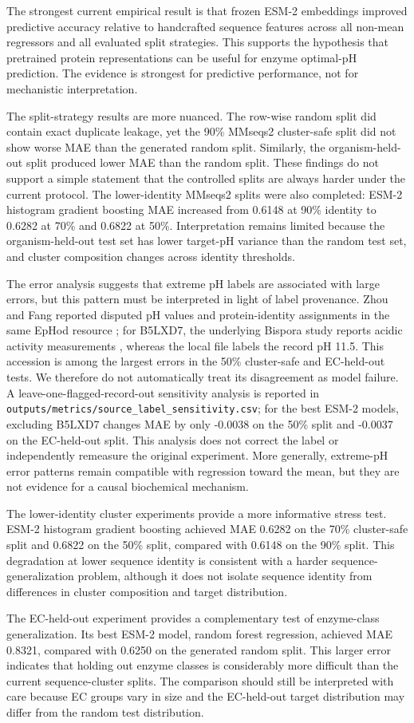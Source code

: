 The strongest current empirical result is that frozen ESM-2 embeddings improved predictive accuracy relative to handcrafted sequence features across all non-mean regressors and all evaluated split strategies. This supports the hypothesis that pretrained protein representations can be useful for enzyme optimal-pH prediction. The evidence is strongest for predictive performance, not for mechanistic interpretation.

The split-strategy results are more nuanced. The row-wise random split did contain exact duplicate leakage, yet the 90\% MMseqs2 cluster-safe split did not show worse MAE than the generated random split. Similarly, the organism-held-out split produced lower MAE than the random split. These findings do not support a simple statement that the controlled splits are always harder under the current protocol. The lower-identity MMseqs2 splits were also completed: ESM-2 histogram gradient boosting MAE increased from 0.6148 at 90\% identity to 0.6282 at 70\% and 0.6822 at 50\%. Interpretation remains limited because the organism-held-out test set has lower target-pH variance than the random test set, and cluster composition changes across identity thresholds.

The error analysis suggests that extreme pH labels are associated with large errors, but this pattern must be interpreted in light of label provenance. Zhou and Fang reported disputed pH values and protein-identity assignments in the same EpHod resource \cite{zhou2026caution}; for B5LXD7, the underlying Bispora study reports acidic activity measurements \cite{luo2009novel}, whereas the local file labels the record pH 11.5. This accession is among the largest errors in the 50\% cluster-safe and EC-held-out tests. We therefore do not automatically treat its disagreement as model failure. A leave-one-flagged-record-out sensitivity analysis is reported in \texttt{outputs/metrics/source\_label\_sensitivity.csv}; for the best ESM-2 models, excluding B5LXD7 changes MAE by only -0.0038 on the 50\% split and -0.0037 on the EC-held-out split. This analysis does not correct the label or independently remeasure the original experiment. More generally, extreme-pH error patterns remain compatible with regression toward the mean, but they are not evidence for a causal biochemical mechanism.

The lower-identity cluster experiments provide a more informative stress test. ESM-2 histogram gradient boosting achieved MAE 0.6282 on the 70\% cluster-safe split and 0.6822 on the 50\% split, compared with 0.6148 on the 90\% split. This degradation at lower sequence identity is consistent with a harder sequence-generalization problem, although it does not isolate sequence identity from differences in cluster composition and target distribution.

The EC-held-out experiment provides a complementary test of enzyme-class generalization. Its best ESM-2 model, random forest regression, achieved MAE 0.8321, compared with 0.6250 on the generated random split. This larger error indicates that holding out enzyme classes is considerably more difficult than the current sequence-cluster splits. The comparison should still be interpreted with care because EC groups vary in size and the EC-held-out target distribution may differ from the random test distribution.
